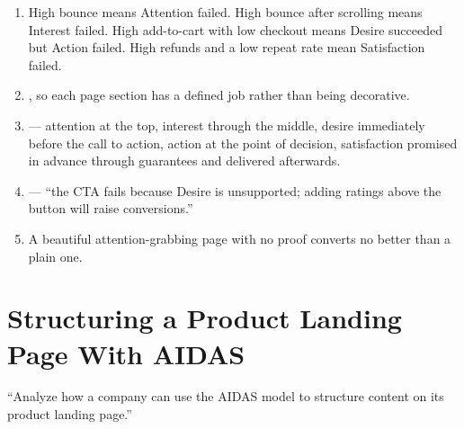 \documentclass{MMTextbook}
\begin{document}
\begin{enumerate}
\item {} High bounce means Attention failed. High
      bounce after scrolling means Interest failed. High add-to-cart with low
      checkout means Desire succeeded but Action failed. High refunds and a low
      repeat rate mean Satisfaction failed.
\item {}, so each page section has a
      defined job rather than being decorative.
\item {} --- attention at the top, interest through the
      middle, desire immediately before the call to action, action at the point of
      decision, satisfaction promised in advance through guarantees and delivered
      afterwards.
\item {} --- ``the CTA fails because Desire is
      unsupported; adding ratings above the button will raise conversions.''
\item {} A beautiful
      attention-grabbing page with no proof converts no better than a plain one.
\end{enumerate}

\section{Structuring a Product Landing Page With AIDAS}

\begin{keybox}
``Analyze how a company can use the AIDAS model to structure content on its
product landing page.''
\end{keybox}
\end{document}
